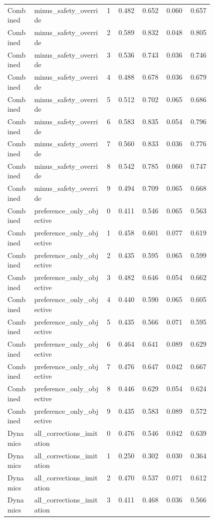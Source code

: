 \documentclass{article}
\begin{document}
\begin{center}
\begin{longtable}{p{0.13\linewidth}p{0.35\linewidth}rrrrr}
Combined & minus\_safety\_override & 1 & 0.482 & 0.652 & 0.060 & 0.657\\
Combined & minus\_safety\_override & 2 & 0.589 & 0.832 & 0.048 & 0.805\\
Combined & minus\_safety\_override & 3 & 0.536 & 0.743 & 0.036 & 0.746\\
Combined & minus\_safety\_override & 4 & 0.488 & 0.678 & 0.036 & 0.679\\
Combined & minus\_safety\_override & 5 & 0.512 & 0.702 & 0.065 & 0.686\\
Combined & minus\_safety\_override & 6 & 0.583 & 0.835 & 0.054 & 0.796\\
Combined & minus\_safety\_override & 7 & 0.560 & 0.833 & 0.036 & 0.776\\
Combined & minus\_safety\_override & 8 & 0.542 & 0.785 & 0.060 & 0.747\\
Combined & minus\_safety\_override & 9 & 0.494 & 0.709 & 0.065 & 0.668\\
Combined & preference\_only\_objective & 0 & 0.411 & 0.546 & 0.065 & 0.563\\
Combined & preference\_only\_objective & 1 & 0.458 & 0.601 & 0.077 & 0.619\\
Combined & preference\_only\_objective & 2 & 0.435 & 0.595 & 0.065 & 0.599\\
Combined & preference\_only\_objective & 3 & 0.482 & 0.646 & 0.054 & 0.662\\
Combined & preference\_only\_objective & 4 & 0.440 & 0.590 & 0.065 & 0.605\\
Combined & preference\_only\_objective & 5 & 0.435 & 0.566 & 0.071 & 0.595\\
Combined & preference\_only\_objective & 6 & 0.464 & 0.641 & 0.089 & 0.629\\
Combined & preference\_only\_objective & 7 & 0.476 & 0.647 & 0.042 & 0.667\\
Combined & preference\_only\_objective & 8 & 0.446 & 0.629 & 0.054 & 0.624\\
Combined & preference\_only\_objective & 9 & 0.435 & 0.583 & 0.089 & 0.572\\
Dynamics & all\_corrections\_imitation & 0 & 0.476 & 0.546 & 0.042 & 0.639\\
Dynamics & all\_corrections\_imitation & 1 & 0.250 & 0.302 & 0.030 & 0.364\\
Dynamics & all\_corrections\_imitation & 2 & 0.470 & 0.537 & 0.071 & 0.612\\
Dynamics & all\_corrections\_imitation & 3 & 0.411 & 0.468 & 0.036 & 0.566\\

\end{longtable}
\end{center}
\end{document}
